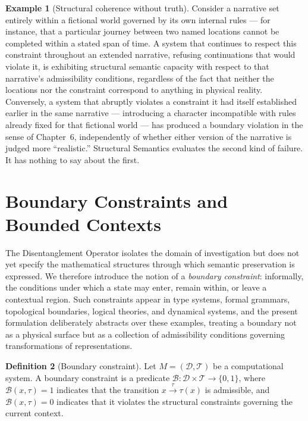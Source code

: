 \documentclass[11pt,twoside,openright]{book}
\numberwithin{equation}{chapter}
\theoremstyle{definition}
\newtheorem{definition}{Definition}[chapter]
\newtheorem{example}[definition]{Example}
\theoremstyle{plain}
\theoremstyle{remark}
\theoremstyle{definition}
\newcommand{\Boundary}{\mathcal{B}}
\newcommand{\Domain}{\mathcal{D}}
\newcommand{\Trans}{\mathcal{T}}
\begin{document}
\begin{example}[Structural coherence without truth]
Consider a narrative set entirely within a fictional world governed by
its own internal rules --- for instance, that a particular journey
between two named locations cannot be completed within a stated span of
time. A system that continues to respect this constraint throughout an
extended narrative, refusing continuations that would violate it, is
exhibiting structural semantic capacity with respect to that narrative's
admissibility conditions, regardless of the fact that neither the
locations nor the constraint correspond to anything in physical reality.
Conversely, a system that abruptly violates a constraint it had itself
established earlier in the same narrative --- introducing a character
incompatible with rules already fixed for that fictional world --- has
produced a boundary violation in the sense of Chapter~6, independently
of whether either version of the narrative is judged more ``realistic.''
Structural Semantics evaluates the second kind of failure. It has
nothing to say about the first.
\end{example}

\section{Boundary Constraints and Bounded Contexts}

The Disentanglement Operator isolates the domain of investigation but does
not yet specify the mathematical structures through which semantic
preservation is expressed. We therefore introduce the notion of a
\emph{boundary constraint}: informally, the conditions under which a
state may enter, remain within, or leave a contextual region. Such
constraints appear in type systems, formal grammars, topological
boundaries, logical theories, and dynamical systems, and the present
formulation deliberately abstracts over these examples, treating a
boundary not as a physical surface but as a collection of admissibility
conditions governing transformations of representations.

\begin{definition}[Boundary constraint]
Let $M=(\Domain,\Trans)$ be a computational system. A boundary constraint
is a predicate $\Boundary:\Domain\times\Trans\to\{0,1\}$, where
$\Boundary(x,\tau)=1$ indicates that the transition $x\xrightarrow{\tau}\tau(x)$
is admissible, and $\Boundary(x,\tau)=0$ indicates that it violates the
structural constraints governing the current context.
\end{definition}
\end{document}
